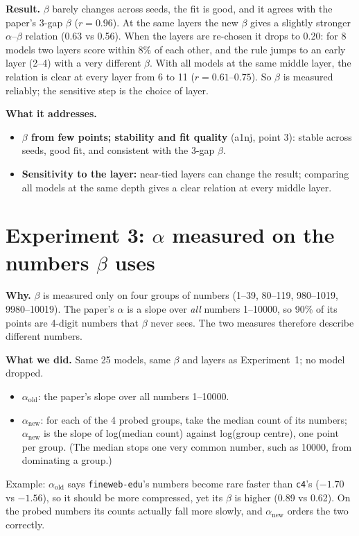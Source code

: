 \textbf{Result.} $\beta$ barely changes across seeds, the fit is good, and it agrees with the
paper's 3-gap $\beta$ ($r = 0.96$). At the same layers the new $\beta$ gives a slightly stronger
$\alpha$--$\beta$ relation (0.63 vs 0.56). When the layers are re-chosen it drops to 0.20: for 8
models two layers score within 8\% of each other, and the rule jumps to an early layer (2--4) with a
very different $\beta$. With all models at the same middle layer, the relation is clear at every
layer from 6 to 11 ($r = 0.61$--$0.75$). So $\beta$ is measured reliably; the sensitive step is the
choice of layer.

\textbf{What it addresses.}
\begin{itemize}
\item \textbf{$\beta$ from few points; stability and fit quality} (a1nj, point 3): stable across seeds,
  good fit, and consistent with the 3-gap $\beta$.
\item \textbf{Sensitivity to the layer:} near-tied layers can change the result; comparing all models at
  the same depth gives a clear relation at every middle layer.
\end{itemize}

\clearpage
\section{Experiment 3: $\alpha$ measured on the numbers $\beta$ uses}

\textbf{Why.} $\beta$ is measured only on four groups of numbers (1--39, 80--119, 980--1019,
9980--10019). The paper's $\alpha$ is a slope over \emph{all} numbers 1--10000, so 90\% of its points
are 4-digit numbers that $\beta$ never sees. The two measures therefore describe different numbers.

\textbf{What we did.} Same 25 models, same $\beta$ and layers as Experiment~1; no model dropped.
\begin{itemize}
\item $\alpha_{\mathrm{old}}$: the paper's slope over all numbers 1--10000.
\item $\alpha_{\mathrm{new}}$: for each of the 4 probed groups, take the median count of its numbers;
  $\alpha_{\mathrm{new}}$ is the slope of log(median count) against log(group centre), one point per
  group. (The median stops one very common number, such as 10000, from dominating a group.)
\end{itemize}
Example: $\alpha_{\mathrm{old}}$ says \texttt{fineweb-edu}'s numbers become rare faster than
\texttt{c4}'s ($-1.70$ vs $-1.56$), so it should be more compressed, yet its $\beta$ is higher (0.89
vs 0.62). On the probed numbers its counts actually fall more slowly, and $\alpha_{\mathrm{new}}$
orders the two correctly.

